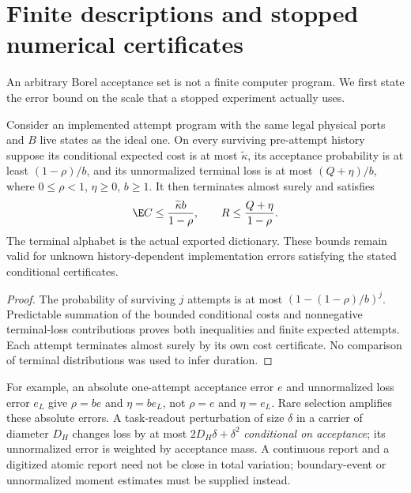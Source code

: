 \section{Finite descriptions and stopped numerical certificates}
\label{sec:numerics}
An arbitrary Borel acceptance set is not a finite computer program. We first state the error bound on the scale that a stopped experiment actually uses.

\begin{proposition}\label{prop:relative}
Consider an implemented attempt program with the same legal physical ports and $B$ live states as the ideal one. On every surviving pre-attempt history suppose its conditional expected cost is at most $\widetilde\kappa$, its acceptance probability is at least $(1-\rho)/b$, and its unnormalized terminal loss is at most $(Q+\eta)/b$, where $0\le\rho<1$, $\eta\ge0$, $b\ge1$. It then terminates almost surely and satisfies
\begin{equation}\label{eq:relative}
 \E C\le\frac{\widetilde\kappa b}{1-\rho},\qquad
 R\le\frac{Q+\eta}{1-\rho}.
\end{equation}
The terminal alphabet is the actual exported dictionary. These bounds remain valid for unknown history-dependent implementation errors satisfying the stated conditional certificates.
\end{proposition}
\begin{proof}
The probability of surviving $j$ attempts is at most $(1-(1-\rho)/b)^j$. Predictable summation of the bounded conditional costs and nonnegative terminal-loss contributions proves both inequalities and finite expected attempts. Each attempt terminates almost surely by its own cost certificate. No comparison of terminal distributions was used to infer duration.
\end{proof}

For example, an absolute one-attempt acceptance error $e$ and unnormalized loss error $e_L$ give $\rho=be$ and $\eta=be_L$, not $\rho=e$ and $\eta=e_L$. Rare selection amplifies these absolute errors. A task-readout perturbation of size $\delta$ in a carrier of diameter $D_H$ changes loss by at most $2D_H\delta+\delta^2$ \emph{conditional on acceptance}; its unnormalized error is weighted by acceptance mass. A continuous report and a digitized atomic report need not be close in total variation; boundary-event or unnormalized moment estimates must be supplied instead.

